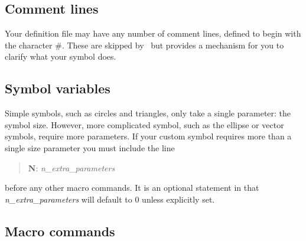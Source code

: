 \subsection{Comment lines}

Your definition file may have any number of comment lines, defined to begin with
the character \#.  These are skipped by \GMT\ but provides a mechanism for you to
clarify what your symbol does.

\subsection{Symbol variables}

Simple symbols, such as circles and triangles, only take a single parameter: the
symbol size.  However, more complicated symbol, such as the ellipse or vector symbols,
require more parameters.  If your custom symbol requires more than a single size parameter
you must include the line
\begin{quote}
	{\bf N}: {\it n\_extra\_parameters}
\end{quote}
before any other macro commands.  It is an optional statement in that {\it  n\_extra\_parameters} will
default to 0 unless explicitly set.

\subsection{Macro commands}

